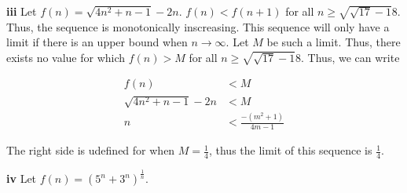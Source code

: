 \documentclass[addpoints]{exam}
\begin{document}
\begin{questions}
\textbf{iii} Let $f(n) = \sqrt{4n^2 + n - 1} - 2n$. $f(n) < f(n+1)$ for all $n \geq \sqrt{\sqrt{17} - 1}{8}$. Thus, the sequence 
is monotonically inscreasing. This sequence will only have a limit if there is an upper bound when $n \to \infty$. Let $M$ be such a limit. 
Thus, there exists no value for which $f(n) > M$ for all $n \geq \sqrt{\sqrt{17} - 1}{8}$. Thus, we can write 

\begin{align*}
    f(n) &< M \\ 
    \sqrt{4n^2 + n - 1} - 2n &< M \\
    n &< \frac{-(m^2 + 1)}{4m - 1}
\end{align*}

The right side is udefined for when $M = \frac{1}{4}$, thus the limit of this sequence is $\frac{1}{4}$.

\textbf{iv} Let $f(n) = (5^n + 3^n)^{\frac{1}{n}}$. 

\question

\end{questions}
\end{document}
